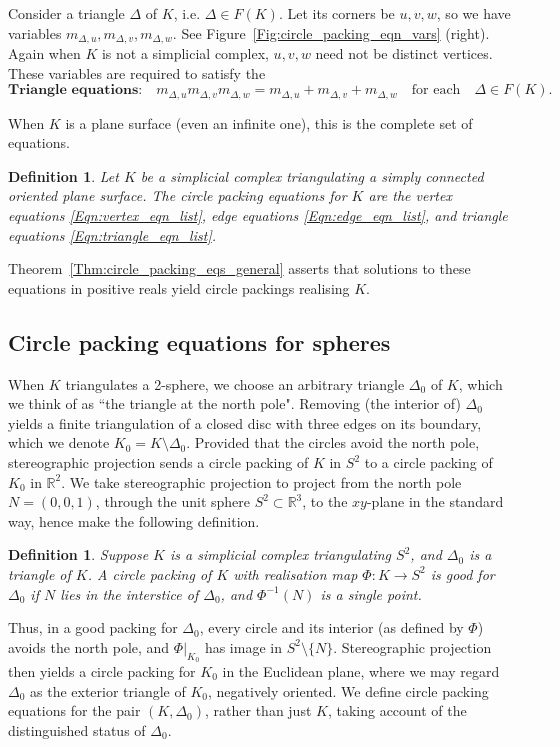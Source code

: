 \documentclass[12pt]{amsart}
\numberwithin{equation}{section}
\newtheorem{definition}[equation]{Definition}
\theoremstyle{named}
\newcommand{\reffig}[1]{Figure~\ref{Fig:#1}}
\newcommand{\refeqn}[1]{\eqref{Eqn:#1}}
\newcommand{\refthm}[1]{Theorem~\ref{Thm:#1}}
\newcommand{\R}{\mathbb{R}}
\newcommand{\To}{\longrightarrow}
\begin{document}
 Consider a triangle $\Delta$ of $K$, i.e. $\Delta \in F(K)$. Let its corners be $u,v,w$, so we have variables $m_{\Delta,u}, m_{\Delta,v}, m_{\Delta,w}$. See \reffig{circle_packing_eqn_vars} (right). Again when $K$ is not a simplicial complex, $u,v,w$ need not be distinct vertices. These variables are required to satisfy the 
\begin{equation}
\label{Eqn:triangle_eqn_list}
\textbf{Triangle equations:} \quad
m_{\Delta,u} m_{\Delta,v} m_{\Delta,w} = m_{\Delta,u} + m_{\Delta,v} + m_{\Delta,w} \quad \text{for each} \quad \Delta \in F(K).
\end{equation}


When $K$ is a plane surface (even an infinite one), this is the complete set of equations. 

\begin{definition}
\label{Def:circle_packing_eqns_disc}
Let $K$ be a simplicial complex triangulating a simply connected oriented plane surface. The \emph{circle packing equations} for $K$ are the vertex equations \refeqn{vertex_eqn_list}, edge equations \refeqn{edge_eqn_list}, and triangle equations \refeqn{triangle_eqn_list}.
\end{definition}

\refthm{circle_packing_eqs_general} asserts that solutions to these equations in positive reals yield circle packings realising $K$.


\subsection{Circle packing equations for spheres}

When $K$ triangulates a 2-sphere, we choose an arbitrary triangle $\Delta_0$ of $K$, which we think of as ``the triangle at the north pole". Removing (the interior of) $\Delta_0$ yields a finite triangulation of a closed disc with three edges on its boundary, which we denote $K_0 = K \setminus \Delta_0$. Provided that the circles avoid the north pole, stereographic projection sends a circle packing of $K$ in $S^2$ to a circle packing of $K_0$ in $\R^2$. We take stereographic projection to project from the north pole $N = (0,0,1)$, through the unit sphere $S^2 \subset \R^3$, to the $xy$-plane in the standard way, hence make the following definition.
\begin{definition}
\label{Def:good_packing}
Suppose $K$ is a simplicial complex triangulating $S^2$, and $\Delta_0$ is a triangle of $K$. A circle packing of $K$ with realisation map $\Phi \colon K \To S^2$ is \emph{good for $\Delta_0$} if $N$ lies in the interstice of $\Delta_0$, and $\Phi^{-1}(N)$ is a single point.
\end{definition}
Thus, in a good packing for $\Delta_0$, every circle and its interior (as defined by $\Phi$) avoids the north pole, and $\Phi|_{K_0}$ has image in $S^2 \setminus \{N\}$. Stereographic projection then yields a circle packing for $K_0$ in the Euclidean plane, where we may regard $\Delta_0$ as the exterior triangle of $K_0$, negatively oriented. 
We define circle packing equations for the pair $(K, \Delta_0)$, rather than just $K$, taking account of the distinguished status of $\Delta_0$.
\end{document}
